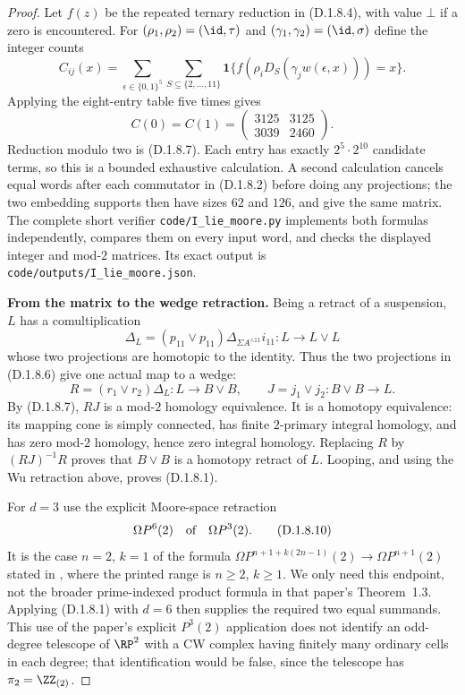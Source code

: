 \begin{proof}
Let $f(z)$ be the repeated ternary reduction in (D.1.8.4), with
value $\bot$ if a zero is encountered. For
$(\rho_1,\rho_2)=(\id,\tau)$ and
$(\gamma_1,\gamma_2)=(\id,\sigma)$ define the integer counts
\[
 C_{ij}(x)=
 \sum_{\epsilon\in\{0,1\}^5}
 \sum_{S\subseteq\{2,\ldots,11\}}
  \mathbf1\{f(\rho_iD_S(\gamma_jw(\epsilon,x)))=x\}.
\]
Applying the eight-entry table five times gives
\[
             C(0)=C(1)=
                  \begin{pmatrix}3125&3125\\3039&2460\end{pmatrix}.
 \tag{D.1.8.9}
\]
Reduction modulo two is (D.1.8.7). Each entry has exactly
$2^5\cdot2^{10}$ candidate terms, so this is a bounded exhaustive
calculation. A second calculation cancels equal words after
each commutator in (D.1.8.2) before doing any projections; the
two embedding supports then have sizes $62$ and $126$, and
give the same matrix. The complete short verifier
\texttt{code/I\_lie\_moore.py} implements both formulas
independently, compares them on every input word, and checks
the displayed integer and mod-$2$ matrices. Its exact output
is \texttt{code/outputs/I\_lie\_moore.json}.

\medskip\noindent
\textbf{From the matrix to the wedge retraction.}
Being a retract of a suspension, $L$ has a comultiplication
\[
 \Delta_L=(p_{11}\vee p_{11})
                \Delta_{\Sigma A^{\wedge11}}i_{11}:L\to L\vee L
\]
whose two projections are homotopic to the identity. Thus the
two projections in (D.1.8.6) give one actual map to a wedge:
\[
 R=(r_1\vee r_2)\Delta_L:L\longrightarrow B\vee B,
 \qquad J=j_1\vee j_2:B\vee B\longrightarrow L.
\]
By (D.1.8.7), $RJ$ is a mod-$2$ homology equivalence. It is a
homotopy equivalence: its mapping cone is simply connected,
has finite $2$-primary integral homology, and has zero mod-$2$
homology, hence zero integral homology. Replacing $R$ by
$(RJ)^{-1}R$ proves that $B\vee B$ is a homotopy retract of
$L$. Looping, and using the Wu retraction above, proves
(D.1.8.1).

For $d=3$ use the explicit Moore-space retraction
\[
                  \Omega P^6(2)\quad\hbox{of}\quad\Omega P^3(2).
 \tag{D.1.8.10}
\]
It is the case $n=2$, $k=1$ of the formula
$\Omega P^{n+1+k(2n-1)}(2)\to\Omega P^{n+1}(2)$ stated
in \cite[proof of Corollary~1.4, p.~3258]{I_ChenWu2013},
where the printed range is $n\geq2$, $k\geq1$.
We only need this endpoint, not the broader prime-indexed product
formula in that paper's Theorem~1.3. Applying (D.1.8.1) with
$d=6$ then supplies the required two equal summands. This use of
the paper's explicit $P^3(2)$ application does not identify an
odd-degree telescope of $\RP^2$ with a CW complex having finitely
many ordinary cells in each degree; that identification would
be false, since the telescope has $\pi_2=\ZZ_{(2)}$.


\end{proof}
